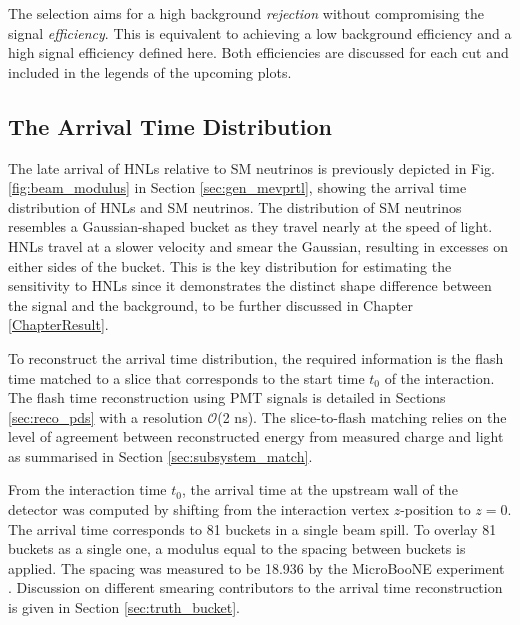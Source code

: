 The selection aims for a high background \textit{rejection} without compromising the signal \textit{efficiency}.        
This is equivalent to achieving a low background efficiency and a high signal efficiency defined here.
Both efficiencies are discussed for each cut and included in the legends of the upcoming plots.                                                                                             

\subsection{The Arrival Time Distribution}
\label{sec:key_dist}


The late arrival of HNLs relative to SM neutrinos is previously depicted in Fig. \ref{fig:beam_modulus} in Section \ref{sec:gen_mevprtl}, showing the arrival time distribution of HNLs and SM neutrinos.
The distribution of SM neutrinos resembles a Gaussian-shaped bucket as they travel nearly at the speed of light.
HNLs travel at a slower velocity and smear the Gaussian, resulting in excesses on either sides of the bucket.
This is the key distribution for estimating the sensitivity to HNLs since it demonstrates the distinct shape difference between the signal and the background, to be further discussed in Chapter \ref{ChapterResult}.

To reconstruct the arrival time distribution, the required information is the flash time matched to a slice that corresponds to the start time $t_0$ of the interaction.
The flash time reconstruction using PMT signals is detailed in Sections \ref{sec:reco_pds} with a resolution $\mathcal{O}$(2 ns).
The slice-to-flash matching relies on the level of agreement between reconstructed energy from measured charge and light as summarised in Section \ref{sec:subsystem_match}.

From the interaction time $t_0$, the arrival time at the upstream wall of the detector was computed by shifting from the interaction vertex $z$-position to $z = 0$.
The arrival time corresponds to 81 buckets in a single beam spill.
To overlay 81 buckets as a single one, a modulus equal to the spacing between buckets is applied.
The spacing was measured to be 18.936 by the MicroBooNE experiment \cite{uboone_ns}.
Discussion on different smearing contributors to the arrival time reconstruction is given in Section \ref{sec:truth_bucket}.

